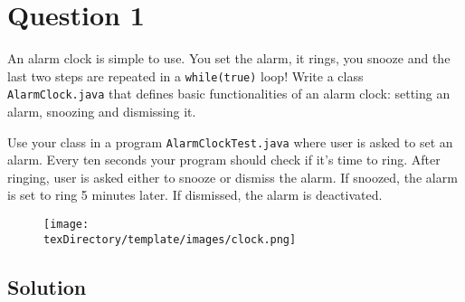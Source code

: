 \documentclass[12pt,letterpaper,twoside]{article}
\begin{document}


\section*{Question 1}

An alarm clock is simple to use.
You set the alarm, it rings, you snooze and the last two steps are repeated in a \texttt{while(true)} loop! Write a class \texttt{AlarmClock.java} that defines basic functionalities of an alarm clock: setting an alarm, snoozing and dismissing it.

Use your class in a program \texttt{AlarmClockTest.java} where user is asked to set an alarm.
Every ten seconds your program should check if it's time to ring.
After ringing, user is asked either to snooze or dismiss the alarm.
If snoozed, the alarm is set to ring 5 minutes later.
If dismissed, the alarm is deactivated.

\begin{figure}[H]\centering
\texttt{[image: \\texDirectory/template/images/clock.png]}
\end{figure}
\newpage

\subsection*{Solution}
\end{document}
